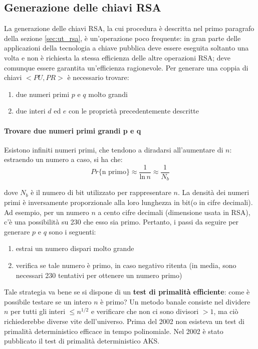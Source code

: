 \subsection{Generazione delle chiavi RSA}
La generazione delle chiavi RSA, la cui procedura è descritta nel primo paragrafo della sezione \ref{sec:ut_rsa}, è un'operazione poco frequente: in gran parte delle applicazioni della tecnologia a chiave pubblica deve essere eseguita soltanto una volta e non è richiesta la stessa efficienza delle altre operazioni RSA; deve comunque essere garantita un'efficienza ragionevole. 
\newline \newline
Per generare una coppia di chiavi $<PU,PR>$ è necessario trovare:
\begin{enumerate}
\item due numeri primi $p$ e $q$ molto grandi
\item due interi $d$ ed $e$ con le proprietà precedentemente descritte
\end{enumerate}

\paragraph{Trovare due numeri primi grandi p e q}
Esistono infiniti numeri primi, che tendono a diradarsi all'aumentare di $n$: estraendo un numero a caso, si ha che:
\begin{equation}
Pr \{\text{n primo}\} \approx \frac{1}{{\text{ln} \, n}} \approx \frac{1}{N_{b}}
\end{equation}

dove $N_{b}$ è il numero di bit utilizzato per rappresentare $n$. La densità dei numeri primi è inversamente proporzionale alla loro lunghezza in bit(o in cifre decimali). Ad esempio, per un numero $n$ a cento cifre decimali (dimensione usata in RSA), c'è una possibilità su 230 che esso sia primo. Pertanto, i passi da seguire per generare $p$ e $q$ sono i seguenti: 
\begin{enumerate}
\item estrai un numero dispari molto grande
\item verifica se tale numero è primo, in caso negativo ritenta (in media, sono necessari 230 tentativi per ottenere un numero primo)
\end{enumerate}
Tale strategia va bene se si dispone di un \textbf{test di primalità efficiente}: come è possibile testare se un intero $n$ è primo? Un metodo banale consiste nel dividere $n$ per tutti gli interi $ \le n^{1/2}$ e verificare che non ci sono divisori $> 1$, ma ciò richiederebbe diverse vite dell'universo. Prima del 2002 non esisteva un test di primalità deterministico efficace in tempo polinomiale. Nel 2002 è stato pubblicato il test di primalità deterministico AKS.
\newline \newline

